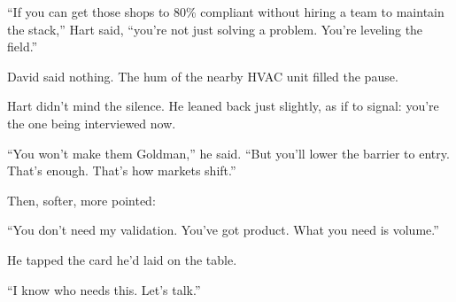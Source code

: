 “If you can get those shops to 80\% compliant without hiring a team to maintain the stack,” Hart said, “you’re not 
just solving a problem. You’re leveling the field.”

David said nothing. The hum of the nearby HVAC unit filled the pause.

Hart didn’t mind the silence. He leaned back just slightly, as if to signal: you’re the one being interviewed now.

“You won’t make them Goldman,” he said. “But you’ll lower the barrier to entry. That’s enough. That’s how markets shift.”

Then, softer, more pointed:

“You don’t need my validation. You’ve got product. What you need is volume.”

He tapped the card he’d laid on the table.

``I know who needs this. Let’s talk.''

\medskip

